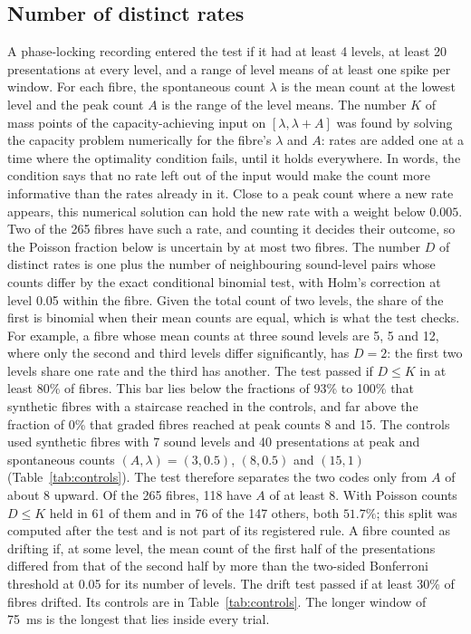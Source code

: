 \subsection{Number of distinct rates}
A phase-locking recording entered the test if it had at least 4 levels, at least 20 presentations at every level, and a range of level
means of at least one spike per window. For each fibre, the spontaneous count $\lambda$ is the mean count at the lowest level and the
peak count $A$ is the range of the level means. The number $K$ of mass points of the capacity-achieving input on $[\lambda,\lambda+A]$
was found by solving the capacity problem numerically for the fibre's $\lambda$ and $A$: rates are added one at a time where the
optimality condition fails, until it holds everywhere. In words, the condition says that no rate left out of the input would make the
count more informative than the rates already in it. Close to a peak count where a new rate appears, this numerical
solution can hold the new rate with a weight below $0.005$. Two of the 265 fibres have such a rate, and counting it decides their
outcome, so the Poisson fraction below is uncertain by at most two fibres. The number $D$ of distinct rates is one plus the number of neighbouring
sound-level pairs whose counts differ by the exact conditional binomial test, with Holm's correction at level 0.05 within the fibre. Given the total count of two levels, the share of the first is binomial when
their mean counts are equal, which is what the test checks. For example, a fibre whose mean counts at three sound levels are 5, 5 and 12, where only the second
and third levels differ significantly, has $D=2$: the first two levels share one rate and the third has another. The test passed if $D\le K$ in at least 80\% of fibres. This bar lies below the fractions of 93\% to 100\% that synthetic
fibres with a staircase reached in the controls, and far above the fraction of 0\% that graded fibres reached at peak counts 8 and 15. The controls used synthetic fibres with 7 sound levels and 40 presentations at peak and spontaneous counts
$(A,\lambda)=(3,0.5)$, $(8,0.5)$ and $(15,1)$ (Table~\ref{tab:controls}). The test therefore separates the two codes only from $A$ of about 8 upward. Of the 265
fibres, 118 have $A$ of at least 8. With Poisson counts $D\le K$ held in 61 of them and in 76 of the 147 others, both $51.7\%$;
this split was computed after the test and is not part of its registered rule. A fibre counted as drifting if, at some level, the mean count of the first half
of the presentations differed from that of the second half by more than the two-sided Bonferroni threshold at 0.05 for its number of
levels. The drift test passed if at least 30\% of fibres drifted. Its controls are in Table~\ref{tab:controls}. The longer window of 75~ms is the longest that lies inside every trial.

